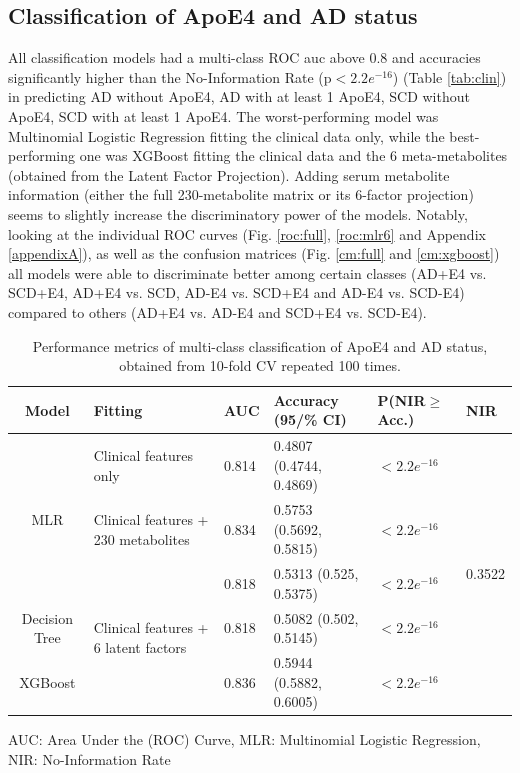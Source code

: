 \documentclass{amsart}
\begin{document}
\subsection{Classification of ApoE4 and AD status}
All classification models had a multi-class ROC \acrshort{auc} above 0.8 and accuracies significantly higher than the No-Information Rate (p$<2.2e^{-16}$) (Table \ref{tab:clin}) in predicting AD without ApoE4, AD with at least 1 ApoE4, SCD without ApoE4, SCD with at least 1 ApoE4. The worst-performing model was  Multinomial Logistic Regression fitting the clinical data only, while the best-performing one was XGBoost fitting the clinical data and the 6 meta-metabolites (obtained from the Latent Factor Projection). Adding serum metabolite information (either the full 230-metabolite matrix or its 6-factor projection) seems to slightly increase the discriminatory power of the models.
Notably, looking at the individual ROC curves (Fig. \ref{roc:full}, \ref{roc:mlr6} and Appendix \ref{appendixA}), as well as the confusion matrices (Fig. \ref{cm:full} and \ref{cm:xgboost}) all models were able to discriminate better among certain classes (AD+E4 vs. SCD+E4, AD+E4 vs. SCD, AD-E4 vs. SCD+E4 and AD-E4 vs. SCD-E4) compared to others (AD+E4 vs. AD-E4 and SCD+E4 vs. SCD-E4).
\begin{table}[H]
  \centering
\caption{Performance metrics of multi-class classification of ApoE4 and AD status, obtained from 10-fold CV repeated 100 times.} 
\label{tab:class_results}
\begin{threeparttable}
\begin{tabular}{clllll}\toprule
Model  & Fitting & AUC & Accuracy (95/\% CI) & P(NIR$\geq$Acc.) & NIR \\ \midrule
\multirow{3}{*}{MLR} & Clinical features only & 0.814 & 0.4807 (0.4744, 0.4869) & $<2.2e^{-16}$ & \multirow{5}{*}{0.3522} \\
& Clinical features + 230 metabolites & 0.834 & 0.5753 (0.5692, 0.5815) & $<2.2e^{-16}$ &  \\
& \multirow{3}{*}{Clinical features + 6 latent factors} & 0.818 & 0.5313 (0.525, 0.5375) & $<2.2e^{-16}$ &  \\
Decision Tree & & 0.818 & 0.5082 (0.502, 0.5145) & $<2.2e^{-16}$ &  \\
XGBoost & & 0.836 & 0.5944 (0.5882, 0.6005) & $<2.2e^{-16}$ &  \\ \bottomrule
\end{tabular}
\begin{tablenotes}
  \item[]  AUC: Area Under the (ROC) Curve, MLR: Multinomial Logistic Regression, NIR: No-Information Rate
\end{tablenotes}
\end{threeparttable}
\end{table}
\end{document}
